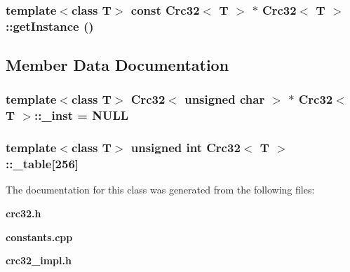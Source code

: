 \subsubsection{\setlength{\rightskip}{0pt plus 5cm}template$<$class T$>$ const {\bf Crc32}$<$ T $>$ $\ast$ {\bf Crc32}$<$ T $>$::get\-Instance ()\hspace{0.3cm}{\tt  [inline, static]}}\label{classCrc32_e0}




\subsection{Member Data Documentation}
\subsubsection{\setlength{\rightskip}{0pt plus 5cm}template$<$class T$>$ {\bf Crc32}$<$ unsigned char $>$ $\ast$ {\bf Crc32}$<$ T $>$::{\bf \_\-inst} = NULL\hspace{0.3cm}{\tt  [static, protected]}}\label{classCrc32_t0}


\subsubsection{\setlength{\rightskip}{0pt plus 5cm}template$<$class T$>$ unsigned int {\bf Crc32}$<$ T $>$::{\bf \_\-table}[256]\hspace{0.3cm}{\tt  [protected]}}\label{classCrc32_p0}




The documentation for this class was generated from the following files:\begin{CompactItemize}
\item 
{\bf crc32.h}\item 
{\bf constants.cpp}\item 
{\bf crc32\_\-impl.h}\end{CompactItemize}
